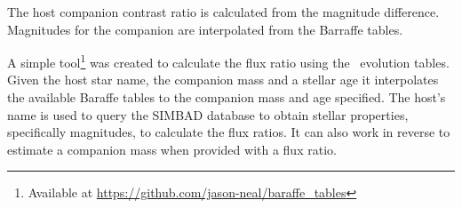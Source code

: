 \documentclass[fleqn,usenatbib]{mnras}
\newcommand*\bl{\color{blue}}
\begin{document}
    {\bl The host companion contrast ratio is calculated from the magnitude difference. Magnitudes for the companion are interpolated from the Barraffe tables.
        
        A simple tool\footnote{Available at \url{https://github.com/jason-neal/baraffe_tables}} was created to calculate the flux ratio using the~\citep{baraffe_evolutionary_2003,baraffe_new_2015} evolution tables. Given the host star name, the companion mass and a stellar age it interpolates the available Baraffe tables to the companion mass and age specified. The host's name is used to query the {SIMBAD} database to obtain stellar properties, specifically magnitudes, to calculate the flux ratios. It can also work in reverse to estimate a companion mass when provided with a flux ratio.}
    
    \bsp{}	%
    \label{lastpage}
\end{document}
